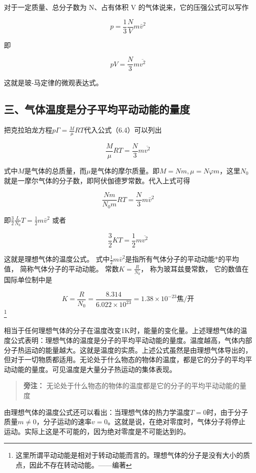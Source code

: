 对于一定质量、总分子数为 N、占有体积 V 的气体说来，它的压强公式可以写作

\[
p = \frac {1}{3} \frac {N}{V} m \bar {v} ^ {2} \tag {6.3}
\]

即

\[
pV=\frac{N}{3}m\overline{v^2} \tag{6.4}
\]

这就是玻-马定律的微观表达式。

\subsection{三、气体温度是分子平均平动动能的量度}\label{ux4e09ux6c14ux4f53ux6e29ux5ea6ux662fux5206ux5b50ux5e73ux5747ux5e73ux52a8ux52a8ux80fdux7684ux91cfux5ea6}

把克拉珀龙方程\(p\Gamma = \frac{M}{\mu} RT\)代入公式（6.4）可以列出

\[
\frac{M}{\mu}RT=\frac{N}{3}m\overline{v^2}
\]

式中\(M\)是气体的总质量，而\(\mu\)是气体的摩尔质量。即\(M = Nm, \mu = N\varphi m\)，这里\(N_0\)就是一摩尔气体的分子数，即阿伏伽德罗常数。代入上式可得

\[
\frac {N m}{N _ {0} m} R T = \frac {N}{3} m \bar {v} ^ {2}
\]

即\(\frac{3}{2}\frac{L}{N_0} T = \frac{1}{2} m\bar{v}^2\) 或者

\[
\frac32KT=\frac12m\overline{v^2} \tag{6.5}
\]

这就是理想气体的温度公式。
式中\(\frac{1}{2} m\bar{v}^2\)是指所有气体分子的平动动能*的平均值，
简称气体分子的平动动能。 常数\(K = \frac{R}{N_0}\)， 称为玻耳兹曼常数，
它的数值在国际单位制中是

\[
K = \frac {R}{N _ {0}} = \frac {8.314}{6.022 \times 10 ^ {23}} = 1.38 \times 10 ^ {- 23} \text{焦/开}
\]\footnote{这里所谓平动动能是相对于转动动能而言的。理想气体的分子是没有大小的质点，因此不存在转动动能。------编著}

相当于任何理想气体的分子在温度改变1K时，能量的变化量。上述理想气体的温度公式表明：理想气体的温度是分子的平均平动动能的量度。温度越高，气体内部分子热运动的能量越大。这就是温度的实质。上述公式虽然是由理想气体导出的，但对于一切物质都适用。无论处于什么物态的物体的温度，都是它的分子的平均平动动能的量度。可见温度是大量分子热运动的集体表现。

\begin{quote}
\textbf{旁注：}
无论处于什么物态的物体的温度都是它的分子的平均平动动能的量度
\end{quote}

由理想气体的温度公式还可以看出：当理想气体的热力学温度\(T = 0\)时，由于分子质量\(m \neq 0\)，分子运动的速率\(v = 0\)。这就是说，在绝对零度时，气体分子将停止运动。实际上这是不可能的，因为绝对零度是不可能达到的。

